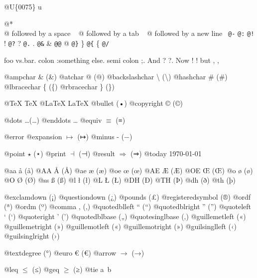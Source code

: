 \documentclass{book}
\renewcommand{\_}{\Texinfounderscore\discretionary{}{}{}}
\begin{document}
@U\{0075\} u

@* \leavevmode{}\\
@ followed by a space
\ {}
@ followed by a tab
\ {}
@ followed by a new line
\ {}\texttt{@-} \-{}
\texttt{@:} \@
\texttt{@!} \@!
\texttt{@?} \@?
\texttt{@.} \@.
\texttt{@\&} \&
\texttt{@@} @
\texttt{@\}} \}
\texttt{@\{} \{
\texttt{@/} 

foo vs.\@ bar. 
colon :\@And something else.
semi colon ;\@.
And ? ?\@.
Now ! !\@@
but , ,\@

@ampchar \& (\&)
@atchar @ (@)
@backslashchar \textbackslash{} (\textbackslash{})
@hashchar \# (\#)
@lbracechar \{ (\{)
@rbracechar \} (\})

@TeX \TeX{}
@LaTeX \LaTeX{}
@bullet \textbullet{} (•)
@copyright \copyright{} (©)

@dots \dots{}\@ (…)
@enddots \dots{}
@equiv $\equiv{}$ (≡)

@error 
@expansion $\mapsto{}$ (↦)
@minus - (−)

@point $\star{}$ (⋆)
@print $\dashv{}$ (⊣)
@result $\Rightarrow{}$ (⇒)
@today \today{}

@aa \aa{} (å)
@AA \AA{} (Å)
@ae \ae{} (æ)
@oe \oe{} (œ)
@AE \AE{} (Æ)
@OE \OE{} (Œ)
@o \o{} (ø)
@O \O{} (Ø)
@ss \ss{} (ß)
@l \l{} (ł)
@L \L{} (Ł)
@DH \DH{} (Ð)
@TH \TH{} (Þ)
@dh \dh{} (ð)
@th \th{} (þ)

@exclamdown \textexclamdown{} (¡)
@questiondown \textquestiondown{} (¿)
@pounds \textsterling{} (£)
@registeredsymbol \circledR{} (®)
@ordf \textordfeminine{} (ª)
@ordm \textordmasculine{} (º)
@comma , (,)
@quotedblleft \textquotedblleft{} (“)
@quotedblright \textquotedblright{} (”)
@quoteleft \textquoteleft{} (‘)
@quoteright \textquoteright{} (’)
@quotedblbase \quotedblbase{} („)
@quotesinglbase \quotesinglbase{} (‚)
@guillemetleft \guillemotleft{} («)
@guillemetright \guillemotright{} (»)
@guillemotleft \guillemotleft{} («)
@guillemotright \guillemotright{} (»)
@guilsinglleft \guilsinglleft{} (‹)
@guilsinglright \guilsinglright{} (›)

@textdegree \textdegree{} (°)
@euro \euro{} (€)
@arrow $\rightarrow{}$ (→)

@leq $\leq{}$ (≤)
@geq $\geq{}$ (≥)
@tie a~b
\end{document}
